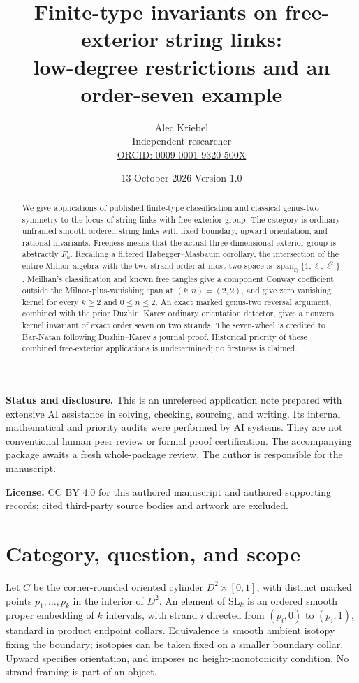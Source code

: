 \documentclass[11pt]{article}
\title{Finite-type invariants on free-exterior string links:\\
low-degree restrictions and an order-seven example}
\author{Alec Kriebel\\Independent researcher\\
\small\href{https://orcid.org/0009-0001-9320-500X}{ORCID: 0009-0001-9320-500X}}
\date{13 October 2026 \quad Version 1.0}
\theoremstyle{remark}\newtheorem{remark}[theorem]{Remark}
\newcommand{\Q}{\mathbb Q}
\newcommand{\SL}{\mathrm{SL}}
\begin{document}
\maketitle
\begin{abstract}
We give applications of published finite-type classification and classical
genus-two symmetry to the locus of string links with free exterior group.
The category is ordinary unframed smooth ordered string links with fixed
boundary, upward orientation, and rational invariants. Freeness means that
the actual three-dimensional exterior group is abstractly $F_k$.
Recalling a filtered Habegger--Masbaum corollary, the intersection of the
entire Milnor algebra with the two-strand order-at-most-two space is
$\operatorname{span}_{\Q}\{1,\ell,\ell^2\}$.
Meilhan's classification and known free tangles give a component Conway
coefficient outside the Milnor-plus-vanishing span at $(k,n)=(2,2)$, and
give zero vanishing kernel for every $k\geq2$ and $0\leq n\leq2$.
An exact marked genus-two reversal argument, combined with the prior
Duzhin--Karev ordinary orientation detector, gives a nonzero kernel
invariant of exact order seven on two strands.
The seven-wheel is credited to Bar-Natan following Duzhin--Karev's journal
proof. Historical priority of these combined free-exterior applications
is undetermined; no firstness is claimed.
\end{abstract}
\noindent\textbf{Status and disclosure.}
This is an unrefereed application note prepared with extensive AI
assistance in solving, checking, sourcing, and writing. Its internal
mathematical and priority audits were performed by AI systems. They are
not conventional human peer review or formal proof certification.
The accompanying package awaits a fresh whole-package review.
The author is responsible for the manuscript.
\smallskip

\noindent\textbf{License.} \href{https://creativecommons.org/licenses/by/4.0/}{CC BY 4.0}
for this authored manuscript and authored supporting records; cited
third-party source bodies and artwork are excluded.

\section{Category, question, and scope}
Let $C$ be the corner-rounded oriented cylinder $D^2\times[0,1]$, with
distinct marked points $p_1,\ldots,p_k$ in the interior of $D^2$.
An element of $\SL_k$ is an ordered smooth proper embedding of $k$ intervals,
with strand $i$ directed from $(p_i,0)$ to $(p_i,1)$, standard in product
endpoint collars. Equivalence is smooth ambient isotopy fixing the boundary;
isotopies can be taken fixed on a smaller boundary collar. Upward specifies
orientation, and imposes no height-monotonicity condition. No strand framing
is part of an object.
\end{document}
